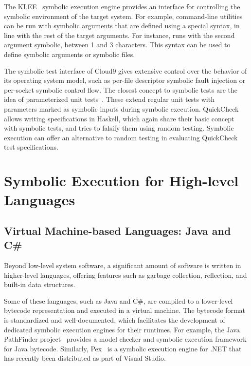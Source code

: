 The KLEE~\cite{klee} symbolic execution engine provides an interface for controlling the symbolic environment of the target system.  For example, command-line utilities can be run with symbolic arguments that are defined using a special syntax, in line with the rest of the target arguments.  For instance,  runs  with the second argument symbolic, between 1 and 3 characters.  This syntax can be used to define symbolic arguments or symbolic files.

The symbolic test interface of Cloud9 gives extensive control over the behavior of its operating system model, such as per-file descriptor symbolic fault injection or per-socket symbolic control flow.
%
The closest concept to symbolic tests are the idea of parameterized unit tests~\cite{tillmann-puts}. These extend regular unit tests with parameters marked as symbolic inputs during symbolic execution.
%
QuickCheck~\cite{quickcheck} allows writing specifications in Haskell, which again share their basic concept with symbolic tests, and tries to falsify them using random testing.  Symbolic execution can offer an alternative to random testing in evaluating QuickCheck test specifications.


\section{Symbolic Execution for High-level Languages}
\label{sec:relwork:interplang}

\subsection{Virtual Machine-based Languages: Java and C\#}

Beyond low-level system software, a significant amount of software is written in higher-level languages, offering features such as garbage collection, reflection, and built-in data structures.

Some of these languages, such as Java and C\#, are compiled to a lower-level bytecode representation and executed in a virtual machine.
%
The bytecode format is standardized and well-documented, which facilitates the development of dedicated symbolic execution engines for their runtimes.
%
For example, the Java PathFinder project~\cite{visser-jpf,jpf-symbex,jpf-testgen} provides a model checker and symbolic execution framework for Java bytecode.
%
Similarly, Pex~\cite{tillmann-pex} is a symbolic execution engine for .NET that has recently been distributed as part of Visual Studio.

